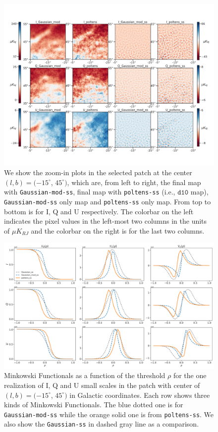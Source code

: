 \documentclass[twocolumn]{aastex631}
\begin{document}
\begin{figure}
    \centering
    \includegraphics[width=180mm]{figures/maps_patch_345_45.pdf}
    \caption{We show the zoom-in plots in the selected patch at the center $(l, b) = (-15^{\circ}$, $45^{\circ})$, which are, from left to right, the final map with \texttt{Gaussian-mod-ss}, final map with \texttt{poltens-ss} (i.e., $\texttt{d10}$ map), \texttt{Gaussian-mod-ss} only map and \texttt{poltens-ss} only map. From top to bottom is for I, Q and U respectively. The colorbar on the left indicates the pixel values in the left-most two columns in the units of $\mu K_{RJ}$ and the colorbar on the right is for the last two columns. }
    \label{fig:maps:patch2}
\end{figure}

\begin{figure}
    \centering
    \includegraphics[width=180mm]{figures/MFs_345_45_with_G_rescaled.pdf}
    \caption{Minkowski Functionals as a function of the threshold $\rho$ for the one realization of I, Q and U small scales in the patch with center of $(l, b) = (-15^{\circ}$, $45^{\circ})$ in Galactic coordinates. Each row shows three kinds of Minkowski Functionals. The blue dotted one is for \texttt{Gaussian-mod-ss} while the orange solid one is from \texttt{poltens-ss}. We also show the \texttt{Gaussian-ss} in dashed gray line as a comparison.}
    \label{fig:MF:patch2}
\end{figure}
\end{document}
